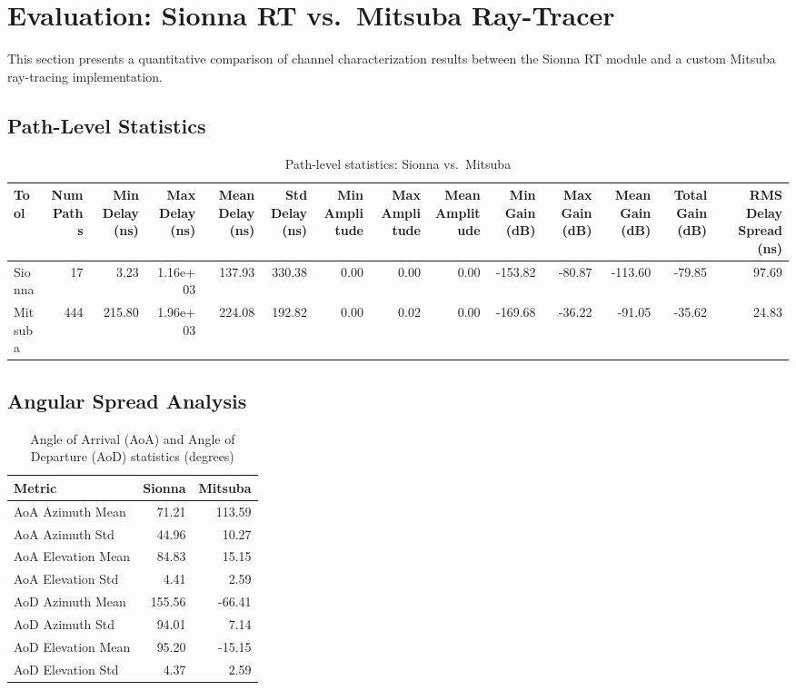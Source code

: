 
\section{Evaluation: Sionna RT vs.\ Mitsuba Ray-Tracer}
\label{sec:evaluation}

This section presents a quantitative comparison of channel characterization results between 
the Sionna RT module and a custom Mitsuba ray-tracing implementation.


\subsection{Path-Level Statistics}

\begin{table}
\caption{Path-level statistics: Sionna vs.\ Mitsuba}
\label{tab:path_stats}
\begin{tabular}{lrrrrrrrrrrrrr}
\toprule
Tool & Num Paths & Min Delay (ns) & Max Delay (ns) & Mean Delay (ns) & Std Delay (ns) & Min Amplitude & Max Amplitude & Mean Amplitude & Min Gain (dB) & Max Gain (dB) & Mean Gain (dB) & Total Gain (dB) & RMS Delay Spread (ns) \\
\midrule
Sionna & 17 & 3.23 & 1.16e+03 & 137.93 & 330.38 & 0.00 & 0.00 & 0.00 & -153.82 & -80.87 & -113.60 & -79.85 & 97.69 \\
Mitsuba & 444 & 215.80 & 1.96e+03 & 224.08 & 192.82 & 0.00 & 0.02 & 0.00 & -169.68 & -36.22 & -91.05 & -35.62 & 24.83 \\
\bottomrule
\end{tabular}
\end{table}



\subsection{Angular Spread Analysis}

\begin{table}
\caption{Angle of Arrival (AoA) and Angle of Departure (AoD) statistics (degrees)}
\label{tab:angular_stats}
\begin{tabular}{lrr}
\toprule
Metric & Sionna & Mitsuba \\
\midrule
AoA Azimuth Mean & 71.21 & 113.59 \\
AoA Azimuth Std & 44.96 & 10.27 \\
AoA Elevation Mean & 84.83 & 15.15 \\
AoA Elevation Std & 4.41 & 2.59 \\
AoD Azimuth Mean & 155.56 & -66.41 \\
AoD Azimuth Std & 94.01 & 7.14 \\
AoD Elevation Mean & 95.20 & -15.15 \\
AoD Elevation Std & 4.37 & 2.59 \\
\bottomrule
\end{tabular}
\end{table}



